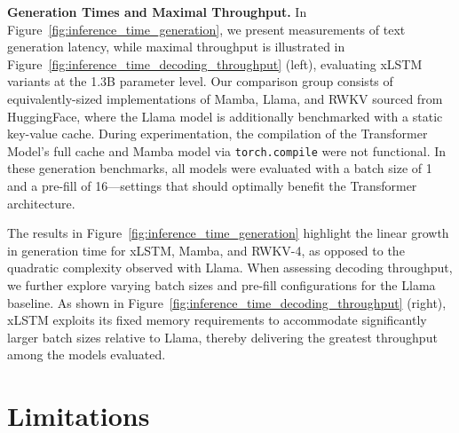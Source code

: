 \textbf{Generation Times and Maximal Throughput.} In Figure~\ref{fig:inference_time_generation}, we present measurements of text generation latency, while maximal throughput is illustrated in Figure~\ref{fig:inference_time_decoding_throughput} (left), evaluating xLSTM variants at the 1.3B parameter level. Our comparison group consists of equivalently-sized implementations of Mamba, Llama, and RWKV sourced from HuggingFace, where the Llama model is additionally benchmarked with a static key-value cache. During experimentation, the compilation of the Transformer Model's full cache and Mamba model via \texttt{torch.compile} were not functional. In these generation benchmarks, all models were evaluated with a batch size of 1 and a pre-fill of 16—settings that should optimally benefit the Transformer architecture.

The results in Figure~\ref{fig:inference_time_generation} highlight the linear growth in generation time for xLSTM, Mamba, and RWKV-4, as opposed to the quadratic complexity observed with Llama. When assessing decoding throughput, we further explore varying batch sizes and pre-fill configurations for the Llama baseline. As shown in Figure~\ref{fig:inference_time_decoding_throughput} (right), xLSTM exploits its fixed memory requirements to accommodate significantly larger batch sizes relative to Llama, thereby delivering the greatest throughput among the models evaluated.

\section{Limitations}

